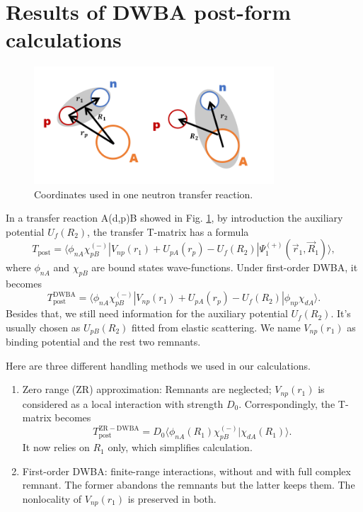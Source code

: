 \section{Results of DWBA post-form calculations}\label{sec:post}

\begin{figure}[t]
	\centering
	\includegraphics[width=0.80\textwidth]{transfer.png}
	\caption{Coordinates used in one neutron transfer reaction. }
	\label{fig:transfer}
\end{figure}
In a transfer reaction A(d,p)B showed in Fig. \ref{fig:transfer}, by introduction the auxiliary potential $U_f(R_2)$, the transfer T-matrix has a formula \cite{thompson2009nuclear}
\begin{equation}\label{eq:postexact}
	T_{\mathrm{post}}=\langle\phi_{nA}\chi_{pB}^{(-)}\left|V_{np}(r_1)+U_{pA}(r_p)-U_f(R_2)\right|\Psi_1^{(+)}(\vec{r}_1,\vec{R}_1)\rangle,
\end{equation}
where $\phi_{nA}$ and $\chi_{pB}$ are bound states wave-functions. 
Under first-order DWBA, it becomes
\begin{equation}\label{tpost}
	T_{\mathrm{post}}^{\mathrm{DWBA}}=\langle\phi_{nA}\chi_{pB}^{(-)}\left|V_{np}(r_1)+U_{pA}(r_p)-U_f(R_2)\right|\phi_{np}\chi_{dA}\rangle.
\end{equation}
Besides that, we still need information for the auxiliary potential $U_f(R_2)$. 
It's usually chosen as $U_{pB}(R_2)$ fitted from elastic scattering.
We name $V_{np}(r_1)$ as binding potential and the rest two remnants.

Here are three different handling methods we used in our calculations.
\begin{enumerate}
\item Zero range (ZR) approximation: Remnants are neglected; $V_{np}(r_1)$ is considered as a local interaction with strength $D_0$.
	Correspondingly, the T-matrix becomes
	\begin{equation}
		T_{\mathrm{post}}^{\mathrm{ZR-DWBA}}=D_0\langle\phi_{nA}(R_1)\chi_{pB}^{(-)}| \chi_{dA}(R_1)\rangle.
	\end{equation}
	It now relies on $R_1$ only, which simplifies calculation.
	\item First-order DWBA: finite-range interactions, without and with full complex remnant. The former abandons the remnants but the latter keeps them. The nonlocality of $V_{np}(r_1)$ is preserved in both.
\end{enumerate}

